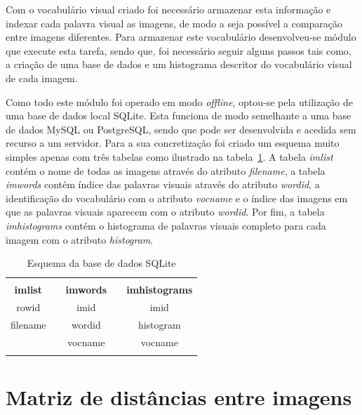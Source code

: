 Com o vocabulário visual criado foi necessário armazenar esta informação e indexar cada palavra visual as imagens, de modo a seja possível a comparação entre imagens diferentes. Para armazenar este vocabulário desenvolveu-se módulo que execute esta tarefa, sendo que, foi necessário seguir alguns passos tais como, a criação de uma base de dados e um histograma descritor do vocabulário visual de cada imagem. 

Como todo este módulo foi operado em modo \textit{offline}, optou-se pela utilização de uma base de dados local SQLite. Esta funciona de modo semelhante a uma base de dados MySQL ou PostgreSQL, sendo que pode ser desenvolvida e acedida sem recurso a um servidor. Para a sua concretização foi criado um esquema muito simples apenas com três tabelas como ilustrado na tabela~\ref{tab:schemadb}. A tabela \textit{imlist} contém o nome de todas as imagens através do atributo \textit{filename}, a tabela \textit{imwords} contém índice das palavras visuais através do atributo \textit{wordid}, a identificação do vocabulário com o atributo \textit{vocname} e o índice das imagens em que as palavras visuais aparecem com o atributo \textit{wordid}. Por fim, a tabela \textit{imhistograms} contém o histograma de palavras visuais completo para cada imagem com o atributo \textit{histogram}.

\vspace{1 mm}
\begin{table}[h]
\centering
\begin{tabular}{lcccc}
\multicolumn{5}{l}{} \\ \cline{1-1} \cline{3-3} \cline{5-5} 
\multicolumn{1}{|c|}{\cellcolor[HTML]{C0C0C0}\textbf{imlist}} & \multicolumn{1}{c|}{} & \multicolumn{1}{c|}{\cellcolor[HTML]{C0C0C0}\textbf{imwords}} & \multicolumn{1}{c|}{} & \multicolumn{1}{c|}{\cellcolor[HTML]{C0C0C0}\textbf{imhistograms}} \\ \cline{1-1} \cline{3-3} \cline{5-5} 
\multicolumn{1}{|c|}{rowid} & \multicolumn{1}{c|}{} & \multicolumn{1}{c|}{imid} & \multicolumn{1}{c|}{} & \multicolumn{1}{c|}{imid} \\ \cline{1-1} \cline{3-3} \cline{5-5} 
\multicolumn{1}{|c|}{filename} & \multicolumn{1}{c|}{\multirow{-3}{*}{}} & \multicolumn{1}{c|}{wordid} & \multicolumn{1}{c|}{} & \multicolumn{1}{c|}{histogram} \\ \cline{1-1} \cline{3-3} \cline{5-5} 
 & \multicolumn{1}{l|}{} & \multicolumn{1}{c|}{vocname} & \multicolumn{1}{c|}{\multirow{-4}{*}{}} & \multicolumn{1}{c|}{vocname} \\ \cline{3-3} \cline{5-5} 
\multicolumn{5}{l}{}
\end{tabular}
\caption{Esquema da base de dados SQLite}
\label{tab:schemadb}
\end{table}



\section{Matriz de distâncias entre imagens}